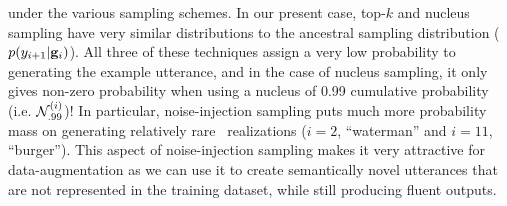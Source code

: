 \noindent under the various sampling schemes. In our present case, top-$k$ and nucleus
sampling have very similar distributions to the ancestral sampling
distribution ($p(y_{i+1}|\mathbf{g}_i)$). All three of these 
techniques assign a very low probability to generating the example utterance,
and in the case of nucleus sampling, it only gives non-zero probability when
using a nucleus of 0.99 cumulative probability (i.e. ${\mathcal{N}}_{.99}^{(i)}$)!
In particular, noise-injection sampling puts much more probability 
mass on generating relatively rare \attributevalue~realizations ($i=2$, ``waterman'' and $i=11$, ``burger''). This aspect of noise-injection sampling
makes it very attractive for data-augmentation as we can use it to create
semantically novel utterances that are not represented in the training dataset,
while still producing fluent outputs.



